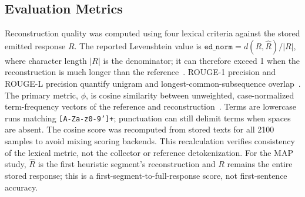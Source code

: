 \documentclass[electronics,article,submit,pdftex,moreauthors]{Definitions/mdpi}
\begin{document}
\begin{table}[ht]
\centering
\caption{Stored response-length covariates ($N=300$ per model), including the two diagnostic series. Character and byte counts refer to emitted token text, excluding framing bytes. Truncation is the percentage of samples with \texttt{token\_count}$\geq 512$.}
\label{tab:length_covariates}
\end{table}

\subsection{Evaluation Metrics}
Reconstruction quality was computed using four lexical criteria against the stored emitted response $R$. The reported Levenshtein value is $\texttt{ed\_norm}=d(R,\widehat{R})/|R|$, where character length $|R|$ is the denominator; it can therefore exceed 1 when the reconstruction is much longer than the reference~\cite{levenshtein1966binary}. ROUGE-1 precision and ROUGE-L precision quantify unigram and longest-common-subsequence overlap~\cite{lin2004rouge}. The primary metric, $\phi$, is cosine similarity between unweighted, case-normalized term-frequency vectors of the reference and reconstruction~\cite{salton1975vector}. Terms are lowercase runs matching \texttt{[A-Za-z0-9']+}; punctuation can still delimit terms when spaces are absent. The cosine score was recomputed from stored texts for all 2100 samples to avoid mixing scoring backends. This recalculation verifies consistency of the lexical metric, not the collector or reference detokenization. For the MAP study, $\widehat{R}$ is the first heuristic segment's reconstruction and $R$ remains the entire stored response; this is a first-segment-to-full-response score, not first-sentence accuracy.
\end{document}
